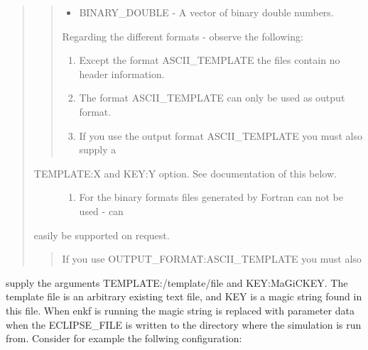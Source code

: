\documentclass[a4paper,10pt,english]{sphinxmanual}
\begin{document}
\begin{sphinxShadowBox}
\begin{quote}
\begin{description}
\begin{quote}
\begin{itemize}
\item {} 
BINARY\_DOUBLE - A vector of binary double numbers.

\end{itemize}

Regarding the different formats - observe the following:
\begin{enumerate}
\item {} 
Except the format ASCII\_TEMPLATE the files contain no header information.

\item {} 
The format ASCII\_TEMPLATE can only be used as output format.

\item {} 
If you use the output format ASCII\_TEMPLATE you must also supply a

\end{enumerate}
\end{quote}
\begin{description}
\item[{TEMPLATE:X and KEY:Y option. See documentation of this below.}] \leavevmode\begin{enumerate}
\item {} 
For the binary formats files generated by Fortran can not be used - can

\end{enumerate}

\end{description}

easily be supported on request.
\begin{quote}

 If you use OUTPUT\_FORMAT:ASCII\_TEMPLATE you must also
\end{quote}

\end{description}
\end{quote}

supply the arguments TEMPLATE:/template/file and KEY:MaGiCKEY. The template
file is an arbitrary existing text file, and KEY is a magic string found in
this file. When enkf is running the magic string is replaced with parameter
data when the ECLIPSE\_FILE is written to the directory where the simulation
is run from. Consider for example the follwing configuration:
\begin{quote}

%
\begin{sphinxVerbatim}[commandchars=\\\{\}]
   
\end{sphinxVerbatim}


\end{quote}
\end{sphinxShadowBox}
\end{document}
